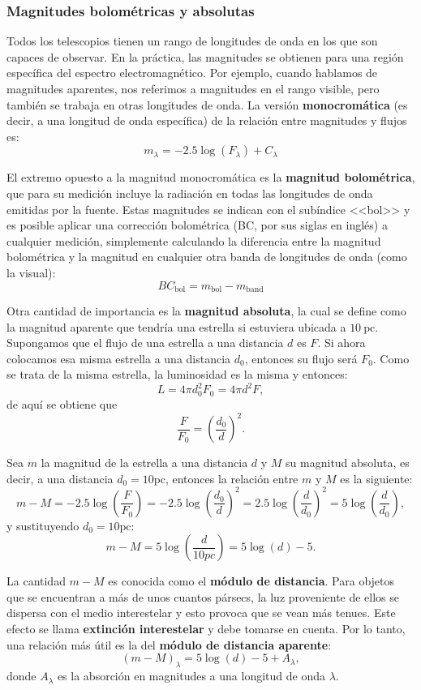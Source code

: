 \subsubsection{Magnitudes bolométricas y absolutas}
Todos los telescopios tienen un rango de longitudes de onda en los que son capaces de observar. En la práctica, las magnitudes se obtienen para una región específica del espectro electromagnético. Por ejemplo, cuando hablamos de magnitudes aparentes, nos referimos a magnitudes en el rango visible, pero también se trabaja en otras longitudes de onda. La versión \textbf{monocromática} (es decir, a una longitud de onda específica) de la relación entre magnitudes y flujos es:
\[ m_{\lambda} = -2.5 \log(F_{\lambda}) + C_{\lambda} \]

El extremo opuesto a la magnitud monocromática es la \textbf{magnitud bolométrica}, que para su medición incluye la radiación en todas las longitudes de onda emitidas por la fuente. Estas magnitudes se indican con el subíndice <<bol>> y es posible aplicar una corrección bolométrica (BC, por sus siglas en inglés) a cualquier medición, simplemente calculando la diferencia entre la magnitud bolométrica y la magnitud en cualquier otra banda de longitudes de onda (como la visual):
\[ BC_{\mathrm{bol}} = m_{\mathrm{bol}} - m_{\mathrm{band}} \]

Otra cantidad de importancia es la \textbf{magnitud absoluta}, la cual se define como la magnitud aparente que tendría una estrella si estuviera ubicada a $10 ~\mathrm{pc}$. Supongamos que el flujo de una estrella a una distancia $ d $ es $ F $. Si ahora colocamos esa misma estrella a una distancia $ d_0 $, entonces su flujo será $ F_0 $. Como se trata de la misma estrella, la luminosidad es la misma y entonces:
\[ L = 4\pi d_0^2 F_0 = 4\pi d^2 F,\]
de aquí se obtiene que
\[ \frac{F}{F_0} = \left( \frac{d_0}{d} \right)^2. \] 

Sea $ m $ la magnitud de la estrella a una distancia $ d $ y $ M $ su magnitud absoluta, es decir, a una distancia $ d_0 = 10 \mathrm{pc} $, entonces la relación entre $ m $ y $ M $ es la siguiente:
\[ m - M =  -2.5\log\left( \frac{F}{F_0} \right) = -2.5\log\left( \frac{d_0}{d} \right)^2 = 2.5 \log\left( \frac{d}{d_0} \right)^2 = 5 \log\left( \frac{d}{d_0} \right), \]
y sustituyendo $ d_0 = 10 \mathrm{pc} $:
\[ m - M = 5\log\left( \frac{d}{10pc} \right) = 5\log(d) - 5. \]

La cantidad $ m - M $ es conocida como el \textbf{módulo de distancia}. Para objetos que se encuentran a más de unos cuantos pársecs, la luz proveniente de ellos se dispersa con el medio interestelar y esto provoca que se vean más tenues. Este efecto se llama \textbf{extinción interestelar} y debe tomarse en cuenta. Por lo tanto, una relación más útil es la del \textbf{módulo de distancia aparente}:
\[ (m - M)_{\lambda} = 5\log(d) - 5 + A_{\lambda}, \]
donde $ A_{\lambda} $ es la absorción en magnitudes a una longitud de onda $ \lambda $.

